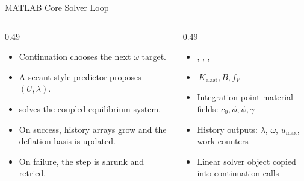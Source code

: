 \documentclass[aspectratio=169,10pt]{beamer}
\begin{document}
\begin{frame}{MATLAB Core Solver Loop}
\small
\begin{columns}[T,totalwidth=\textwidth]
\begin{column}{0.49\textwidth}
\begin{softbox}
\begin{itemize}
  \item Continuation chooses the next \(\omega\) target.
  \item A secant-style predictor proposes \((U,\lambda)\).
  \item {} solves the coupled equilibrium system.
  \item On success, history arrays grow and the deflation basis is updated.
  \item On failure, the step is shrunk and retried.
\end{itemize}
\end{softbox}
\end{column}
\begin{column}{0.49\textwidth}
\begin{softbox}
\begin{itemize}
  \item {}, , , 
  \item \(\,K_{\mathrm{elast}}, B, f_V\,\)
  \item Integration-point material fields: \(c_0, \phi, \psi, \gamma\)
  \item History outputs: \(\lambda\), \(\omega\), \(u_{\max}\), work counters
  \item Linear solver object copied into continuation calls
\end{itemize}
\end{softbox}
\end{column}
\end{columns}
\end{frame}
\end{document}
